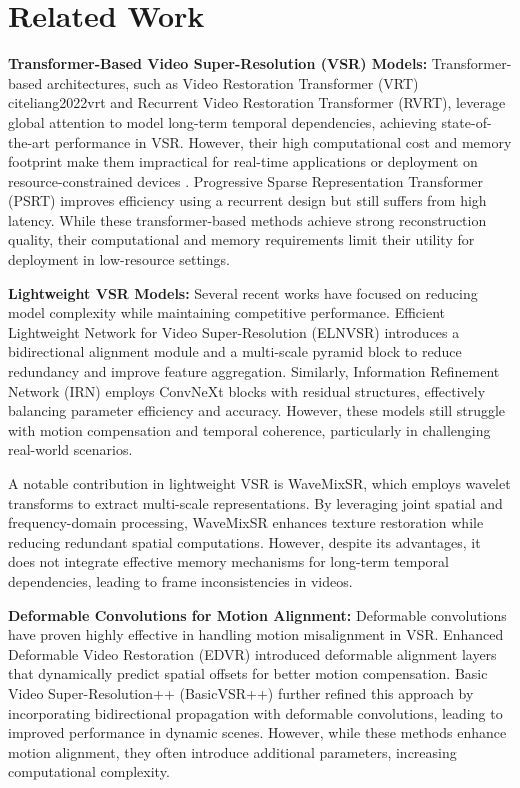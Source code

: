\documentclass[11pt]{article}
\begin{document}
\section{Related Work}
\label{sec:related_work}

\textbf{Transformer-Based Video Super-Resolution (VSR) Models:} 
Transformer-based architectures, such as Video Restoration Transformer (VRT) cite{liang2022vrt} and Recurrent Video Restoration Transformer (RVRT)\cite{liang2022rvrt}, leverage global attention to model long-term temporal dependencies, achieving state-of-the-art performance in VSR. However, their high computational cost and memory footprint make them impractical for real-time applications or deployment on resource-constrained devices \cite{liu2025vsrdiff}. Progressive Sparse Representation Transformer (PSRT) \cite{psrt2023} improves efficiency using a recurrent design but still suffers from high latency. While these transformer-based methods achieve strong reconstruction quality, their computational and memory requirements limit their utility for deployment in low-resource settings.

\textbf{Lightweight VSR Models:} 
Several recent works have focused on reducing model complexity while maintaining competitive performance. Efficient Lightweight Network for Video Super-Resolution (ELNVSR) \cite{efficient2024lightweight} introduces a bidirectional alignment module and a multi-scale pyramid block to reduce redundancy and improve feature aggregation. Similarly, Information Refinement Network (IRN)\cite{zhang2023lightweight} employs ConvNeXt blocks with residual structures, effectively balancing parameter efficiency and accuracy. However, these models still struggle with motion compensation and temporal coherence, particularly in challenging real-world scenarios.  

A notable contribution in lightweight VSR is WaveMixSR\cite{wavemixsr2024}, which employs wavelet transforms to extract multi-scale representations. By leveraging joint spatial and frequency-domain processing, WaveMixSR enhances texture restoration while reducing redundant spatial computations. However, despite its advantages, it does not integrate effective memory mechanisms for long-term temporal dependencies, leading to frame inconsistencies in videos.

\textbf{Deformable Convolutions for Motion Alignment:}  
Deformable convolutions have proven highly effective in handling motion misalignment in VSR. Enhanced Deformable Video Restoration (EDVR) \cite{wang2019edvr} introduced deformable alignment layers that dynamically predict spatial offsets for better motion compensation. Basic Video Super-Resolution++ (BasicVSR++) \cite{chan2022basicvsrpp} further refined this approach by incorporating bidirectional propagation with deformable convolutions, leading to improved performance in dynamic scenes. However, while these methods enhance motion alignment, they often introduce additional parameters, increasing computational complexity.  
\end{document}
